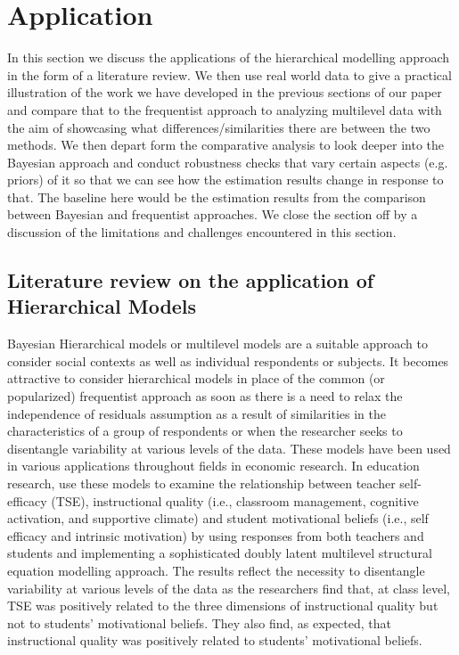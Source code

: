 \section{Application}

In this section we discuss the applications of the hierarchical modelling approach in the form of a literature review. We then use real world data to give a practical illustration of the work we have developed in the previous sections of our paper and compare that to the frequentist approach to analyzing multilevel data with the aim of showcasing what differences/similarities there are between the two methods. We then depart form the comparative analysis to look deeper into the Bayesian approach and conduct robustness checks that vary certain aspects (e.g. priors) of it so that we can see how the estimation results change in response to that. The baseline here would be the estimation results from the comparison between Bayesian and frequentist approaches. We close the section off by a discussion of the limitations and challenges encountered in this section.


\subsection{Literature review on the application of Hierarchical Models}

Bayesian Hierarchical models or multilevel models are a suitable approach to consider social contexts as well as individual respondents or subjects. It becomes attractive to consider hierarchical models in place of the common (or popularized) frequentist approach as soon as there is a need to relax the independence of residuals assumption as a result of similarities in the characteristics of a group of respondents or when the researcher seeks to disentangle variability at various levels of the data. These models have been used in various applications throughout fields in economic research. In education research, \cite{buric2020teacher} use these models to examine the relationship between teacher self-efficacy (TSE), instructional quality (i.e., classroom management, cognitive activation, and supportive climate) and student motivational beliefs (i.e., self efficacy and intrinsic motivation) by using responses from both teachers and students and implementing a sophisticated doubly latent multilevel structural equation modelling approach. The results reflect the necessity to disentangle variability at various levels of the data as the researchers find that, at class level, TSE was positively related to the three dimensions of instructional quality but not to students' motivational beliefs. They also find, as expected, that instructional quality was positively related to students’ motivational beliefs.

